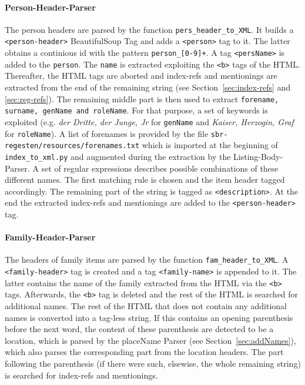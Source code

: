 \paragraph{Person-Header-Parser}
The person headers are parsed by the function \texttt{pers\_header\_to\_XML}. It builds a \texttt{<person-header>} BeautifulSoup Tag and adds a \texttt{<person>} tag to it. The latter obtains a continious id with the pattern \texttt{person\_[0-9]+}. A tag \texttt{<persName>} is added to the \texttt{person}. The \texttt{name} is extracted exploiting the \texttt{<b>} tags of the HTML. Thereafter, the HTML tags are aborted and index-refs and mentionings are extracted from the end of the remaining string (see Section~\ref{sec:index-refs} and \ref{sec:reg-refs}). The remaining middle part is then used to extract \texttt{forename, surname, genName and roleName}. For that purpose, a set of keywords is exploited (e.g. \textit{der Dritte, der Junge, Jr} for \texttt{genName} and \textit{Kaiser, Herzogin, Graf} for \texttt{roleName}). A list of forenames is provided by the file \texttt{sbr-regesten/resources/forenames.txt} which is imported at the beginning of \texttt{index\_to\_xml.py} and augmented during the extraction by the Listing-Body-Parser. A set of regular expressions describes possible combinations of these different names. The first matching rule is chosen and the item header tagged accordingly. The remaining part of the string is tagged as \texttt{<description>}. At the end the extracted index-refs and mentionings are added to the \texttt{<person-header>} tag.

\paragraph{Family-Header-Parser}
The headers of family items are parsed by the function \texttt{fam\_header\_to\_XML}. A \texttt{<family-header>} tag is created and a tag \texttt{<family-name>} is appended to it. The latter contains the name of the family extracted from the HTML via the \texttt{<b>} tags. Afterwards, the \texttt{<b>} tag is deleted and the rest of the HTML is searched for additional names. The rest of the HTML that does not contain any additional names is converted into a tag-less string. If this contains an opening parenthesis before the next word, the content of these parenthesis are detected to be a location, which is parsed by the placeName Parser (see Section~\ref{sec:addNames}), which also parses the corresponding part from the location headers. The part following the parenthesis (if there were such, elsewise, the whole remaining string) is searched for index-refs and mentionings.

